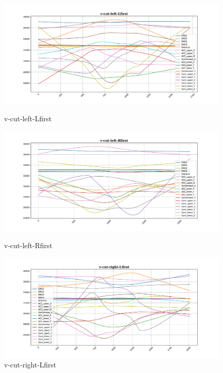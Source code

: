 \begin{figure}[!tbp]
	\begin{minipage}[b]{0.31\textwidth}
		\includegraphics[width=\textwidth]{images/v-cut-left-Lfirst_example.pdf}
		\caption{v-cut-left-Lfirst}
	\end{minipage}
	\begin{minipage}[b]{0.31\textwidth}
		\includegraphics[width=\textwidth]{images/v-cut-left-Rfirst_example.pdf}
		\caption{v-cut-left-Rfirst}
	\end{minipage}
	\begin{minipage}[b]{0.31\textwidth}
		\includegraphics[width=\textwidth]{images/v-cut-right-Lfirst_example.pdf}
		\caption{v-cut-right-Lfirst}
	\end{minipage}
\end{figure}


